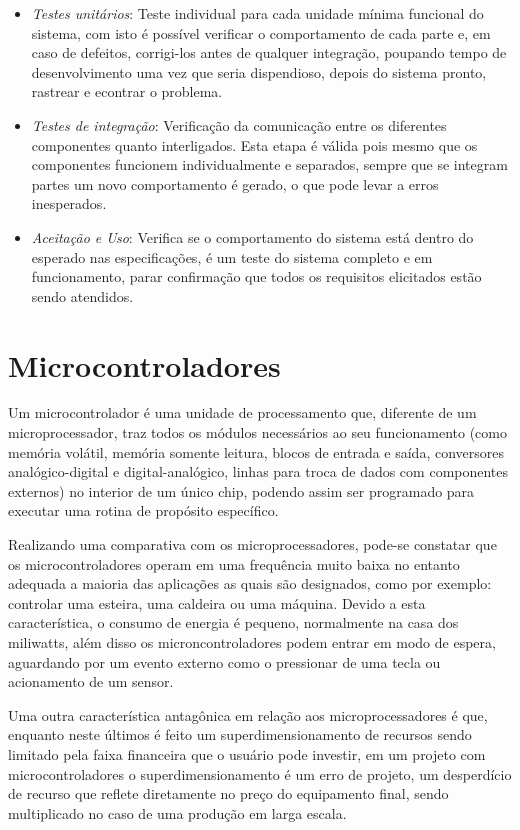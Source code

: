 \begin{itemize}
	\item \emph{Testes unitários}: Teste individual para cada unidade mínima funcional do sistema, com isto é possível verificar o comportamento de cada parte e, em caso de defeitos, corrigi-los antes de qualquer integração, poupando tempo de desenvolvimento uma vez que seria dispendioso, depois do sistema pronto, rastrear e econtrar o problema.
	\item \emph{Testes de integração}: Verificação da comunicação entre os diferentes componentes quanto interligados. Esta etapa é válida pois mesmo que os componentes funcionem individualmente e separados, sempre que se integram partes um novo comportamento é gerado, o que pode levar a erros inesperados.
	\item \emph{Aceitação e Uso}: Verifica se o comportamento do sistema está dentro do esperado nas especificações, é um teste do sistema completo e em funcionamento, parar confirmação que todos os requisitos elicitados estão sendo atendidos.
\end{itemize}



\section{Microcontroladores}

Um microcontrolador é uma unidade de processamento que, diferente de um microprocessador, traz todos os módulos necessários ao seu funcionamento (como memória volátil, memória somente leitura, blocos de entrada e saída, conversores analógico-digital e digital-analógico, linhas para troca de dados com componentes externos) no interior de um único chip, podendo assim ser programado para executar uma rotina de propósito específico.

Realizando uma comparativa com os microprocessadores, pode-se constatar que os microcontroladores operam em uma frequência muito baixa no entanto adequada a maioria das aplicações as quais são designados, como por exemplo: controlar uma esteira, uma caldeira ou uma máquina. Devido a esta característica, o consumo de energia é pequeno, normalmente na casa dos miliwatts, além disso os microncontroladores podem entrar em modo de espera, aguardando por um evento externo como o pressionar de uma tecla ou acionamento de um sensor.

Uma outra característica antagônica em relação aos microprocessadores é que, enquanto neste últimos é feito um superdimensionamento de recursos sendo limitado pela faixa financeira que o usuário pode investir, em um projeto com microcontroladores o superdimensionamento é um erro de projeto, um desperdício de recurso que reflete diretamente no preço do equipamento final, sendo multiplicado no caso de uma produção em larga escala.

